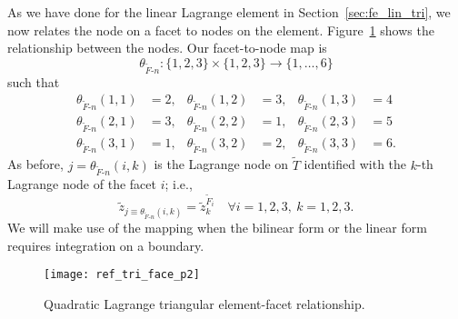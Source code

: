 As we have done for the linear Lagrange element in Section~\ref{sec:fe_lin_tri}, we now relates the node on a facet to nodes on the element. Figure~\ref{fig:fe_ref_tri_face_p2} shows the relationship between the nodes. Our facet-to-node map is 
\begin{equation*}
  \theta_{\tilde F\text{-}n} : \{ 1,2,3 \} \times \{ 1,2,3 \} \to \{ 1,\dots,6 \}
\end{equation*}
such that
\begin{align*}
  \theta_{\tilde F\text{-}n}(1,1) &= 2, & \theta_{\tilde F\text{-}n}(1,2) &= 3, & \theta_{\tilde F\text{-}n}(1,3) &= 4\\
  \theta_{\tilde F\text{-}n}(2,1) &= 3, & \theta_{\tilde F\text{-}n}(2,2) &= 1, & \theta_{\tilde F\text{-}n}(2,3) &= 5\\
  \theta_{\tilde F\text{-}n}(3,1) &= 1, & \theta_{\tilde F\text{-}n}(3,2) &= 2, & \theta_{\tilde F\text{-}n}(3,3) &= 6.
\end{align*}
As before, $j = \theta_{\tilde F\text{-}n}(i,k)$ is the Lagrange node on $\tilde T$ identified with the $k$-th Lagrange node of the facet $i$; i.e.,
\begin{equation*}
  \tilde z_{j \equiv\theta_{\tilde F\text{-}n}(i,k)}  = \tilde z^{\tilde F_i}_k \quad \forall i =1,2,3, \ k = 1,2,3.
\end{equation*}
We will make use of the mapping when the bilinear form or the linear form requires integration on a boundary.

\begin{figure}
  \centering
  \texttt{[image: ref\_tri\_face\_p2]}
  \caption{Quadratic Lagrange triangular element-facet relationship.}
  \label{fig:fe_ref_tri_face_p2}
\end{figure}


